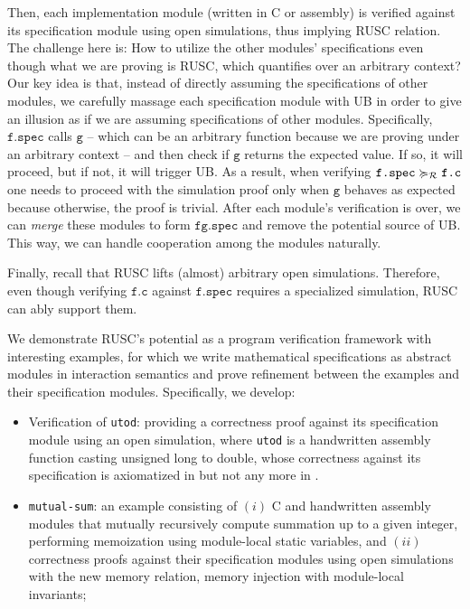 Then, each implementation module (written in C or assembly) is verified against its specification module using open simulations, thus implying RUSC relation.
The challenge here is: How to utilize the other modules' specifications even though what we are proving is RUSC, which quantifies over an arbitrary context?
Our key idea is that, instead of directly assuming the specifications of other modules, we carefully massage each specification module with UB in order to give an illusion as if we are assuming specifications of other modules.
Specifically, $\texttt{f.spec}$ calls $\texttt{g}$ -- which can be an arbitrary function because we are proving under an arbitrary context -- and then check if $\texttt{g}$ returns the expected value. If so, it will proceed, but if not, it will trigger UB.
As a result, when verifying $\texttt{f.spec} \succcurlyeq_{\mathcal{R}} \texttt{f.c}$ one needs to proceed with the simulation proof only when $\texttt{g}$ behaves as expected because otherwise, the proof is trivial.
After each module's verification is over, we can {\it merge} these modules to form $\texttt{fg.spec}$ and remove the potential source of UB.
This way, we can handle cooperation among the modules naturally.

Finally, recall that RUSC lifts (almost) arbitrary open simulations.
Therefore, even though verifying $\texttt{f.c}$ against $\texttt{f.spec}$ requires a specialized simulation, RUSC can ably support them.


We demonstrate RUSC's potential as a program verification framework with interesting
examples, for which we write mathematical specifications as abstract
modules in interaction semantics and prove refinement between the
examples and their specification modules.  Specifically, we develop:
\begin{itemize}
\item Verification of \texttt{utod}: providing a correctness proof
  against its specification module using an open simulation,
  where \texttt{utod} is a handwritten
  assembly function casting unsigned long to double, whose correctness
  against its specification is axiomatized in \cc{} but not any more
  in \ccm{}.
\item \texttt{mutual-sum}: an example consisting of $(i)$ C and
  handwritten assembly modules that mutually recursively compute
  summation up to a given integer, performing memoization using
  module-local static variables, and $(ii)$ correctness proofs
  against their specification modules using open simulations with the
  new memory relation, memory injection with module-local invariants;
\end{itemize}
\medskip

